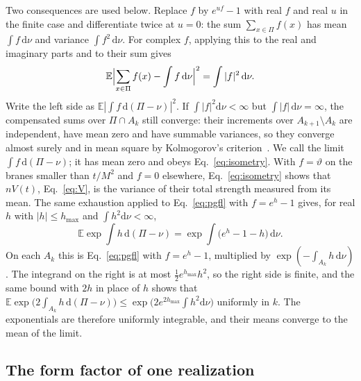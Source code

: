 \documentclass[aps,prd,10pt,twocolumn,superscriptaddress,nofootinbib,floatfix,longbibliography]{revtex4-2}
\newcommand{\bE}{\mathbb{E}}
\newcommand{\dd}{\mathrm{d}}
\begin{document}
Two consequences are used below. Replace $f$ by $e^{uf}-1$ with real $f$ and real $u$ in the finite case and differentiate twice at $u=0$: the sum $\sum_{x\in\Pi}f(x)$ has mean $\int f\,\dd\nu$ and variance $\int f^2\,\dd\nu$. For complex $f$, applying this to the real and imaginary parts and to their sum gives
\begin{equation}
\label{eq:isometry}
\bE\Bigl|\sum_{x\in\Pi}f(x)-\int f\,\dd\nu\Bigr|^2=\int|f|^2\,\dd\nu .
\end{equation}
Write the left side as $\bE|\int f\,\dd(\Pi-\nu)|^2$. If $\int|f|^2\dd\nu<\infty$ but $\int|f|\,\dd\nu=\infty$, the compensated sums over $\Pi\cap A_k$ still converge: their increments over $A_{k+1}\setminus A_k$ are independent, have mean zero and have summable variances, so they converge almost surely and in mean square by Kolmogorov's criterion~\cite{Feller1971}. We call the limit $\int f\,\dd(\Pi-\nu)$; it has mean zero and obeys Eq.~\eqref{eq:isometry}. With $f=\vartheta$ on the branes smaller than $t/M^2$ and $f=0$ elsewhere, Eq.~\eqref{eq:isometry} shows that $nV(t)$, Eq.~\eqref{eq:V}, is the variance of their total strength measured from its mean. The same exhaustion applied to Eq.~\eqref{eq:pgfl} with $f=e^{h}-1$ gives, for real $h$ with $|h|\le h_{\max}$ and $\int h^2\dd\nu<\infty$,
\begin{equation}
\label{eq:expmoment}
\bE\exp\int h\,\dd(\Pi-\nu)=\exp\int\bigl(e^{h}-1-h\bigr)\,\dd\nu .
\end{equation}
On each $A_k$ this is Eq.~\eqref{eq:pgfl} with $f=e^h-1$, multiplied by $\exp(-\int_{A_k}h\,\dd\nu)$. The integrand on the right is at most $\frac12e^{h_{\max}}h^2$, so the right side is finite, and the same bound with $2h$ in place of $h$ shows that $\bE\exp\bigl(2\int_{A_k}h\,\dd(\Pi-\nu)\bigr)\le\exp\bigl(2e^{2h_{\max}}\int h^2\dd\nu\bigr)$ uniformly in $k$. The exponentials are therefore uniformly integrable, and their means converge to the mean of the limit.

\subsection{The form factor of one realization}
\label{sec:formfactor}
\end{document}
